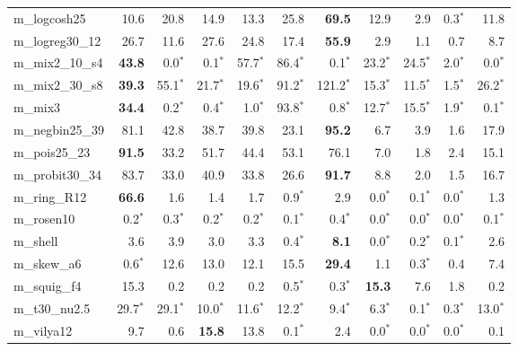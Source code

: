 \begin{tabular}{lrrrrrrrrrr}
m\_logcosh25 & 10.6 & 20.8 & 14.9 & 13.3 & 25.8 & \textbf{69.5} & 12.9 & 2.9 & 0.3$^{*}$ & 11.8 \\
m\_logreg30\_12 & 26.7 & 11.6 & 27.6 & 24.8 & 17.4 & \textbf{55.9} & 2.9 & 1.1 & 0.7 & 8.7 \\
m\_mix2\_10\_s4 & \textbf{43.8} & 0.0$^{*}$ & 0.1$^{*}$ & 57.7$^{*}$ & 86.4$^{*}$ & 0.1$^{*}$ & 23.2$^{*}$ & 24.5$^{*}$ & 2.0$^{*}$ & 0.0$^{*}$ \\
m\_mix2\_30\_s8 & \textbf{39.3} & 55.1$^{*}$ & 21.7$^{*}$ & 19.6$^{*}$ & 91.2$^{*}$ & 121.2$^{*}$ & 15.3$^{*}$ & 11.5$^{*}$ & 1.5$^{*}$ & 26.2$^{*}$ \\
m\_mix3 & \textbf{34.4} & 0.2$^{*}$ & 0.4$^{*}$ & 1.0$^{*}$ & 93.8$^{*}$ & 0.8$^{*}$ & 12.7$^{*}$ & 15.5$^{*}$ & 1.9$^{*}$ & 0.1$^{*}$ \\
m\_negbin25\_39 & 81.1 & 42.8 & 38.7 & 39.8 & 23.1 & \textbf{95.2} & 6.7 & 3.9 & 1.6 & 17.9 \\
m\_pois25\_23 & \textbf{91.5} & 33.2 & 51.7 & 44.4 & 53.1 & 76.1 & 7.0 & 1.8 & 2.4 & 15.1 \\
m\_probit30\_34 & 83.7 & 33.0 & 40.9 & 33.8 & 26.6 & \textbf{91.7} & 8.8 & 2.0 & 1.5 & 16.7 \\
m\_ring\_R12 & \textbf{66.6} & 1.6 & 1.4 & 1.7 & 0.9$^{*}$ & 2.9 & 0.0$^{*}$ & 0.1$^{*}$ & 0.0$^{*}$ & 1.3 \\
m\_rosen10 & 0.2$^{*}$ & 0.3$^{*}$ & 0.2$^{*}$ & 0.2$^{*}$ & 0.1$^{*}$ & 0.4$^{*}$ & 0.0$^{*}$ & 0.0$^{*}$ & 0.0$^{*}$ & 0.1$^{*}$ \\
m\_shell & 3.6 & 3.9 & 3.0 & 3.3 & 0.4$^{*}$ & \textbf{8.1} & 0.0$^{*}$ & 0.2$^{*}$ & 0.1$^{*}$ & 2.6 \\
m\_skew\_a6 & 0.6$^{*}$ & 12.6 & 13.0 & 12.1 & 15.5 & \textbf{29.4} & 1.1 & 0.3$^{*}$ & 0.4 & 7.4 \\
m\_squig\_f4 & 15.3 & 0.2 & 0.2 & 0.2 & 0.5$^{*}$ & 0.3$^{*}$ & \textbf{15.3} & 7.6 & 1.8 & 0.2 \\
m\_t30\_nu2.5 & 29.7$^{*}$ & 29.1$^{*}$ & 10.0$^{*}$ & 11.6$^{*}$ & 12.2$^{*}$ & 9.4$^{*}$ & 6.3$^{*}$ & 0.1$^{*}$ & 0.3$^{*}$ & 13.0$^{*}$ \\
m\_vilya12 & 9.7 & 0.6 & \textbf{15.8} & 13.8 & 0.1$^{*}$ & 2.4 & 0.0$^{*}$ & 0.0$^{*}$ & 0.0$^{*}$ & 0.1 \\
\bottomrule
\end{tabular}
